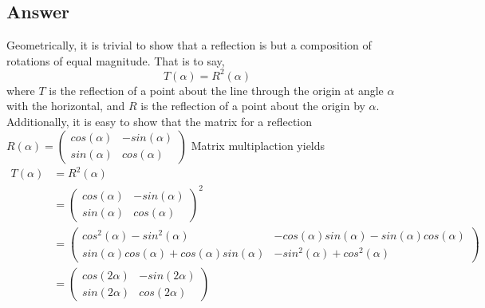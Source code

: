 \documentclass[
	12pt, %
]{fphw}
\begin{document}
\subsection*{Answer}
Geometrically, it is trivial to show that a reflection is but a composition of rotations of equal magnitude. That is to say, $$ T(\alpha)=R^2(\alpha)$$ where $T$ is the reflection of a point about the line through the origin at angle $\alpha$ with the horizontal, and $R$ is the reflection of a point about the origin by $\alpha$. Additionally, it is easy to show that the matrix for a reflection $R(\alpha)=\begin{pmatrix} cos(\alpha) & -sin(\alpha)\\ sin(\alpha) & cos(\alpha) \end{pmatrix}$ 
Matrix multiplaction yields 
\begin{align}
	T(\alpha)&=R^2(\alpha) \\
	&=\begin{pmatrix} cos(\alpha) & -sin(\alpha)\\ sin(\alpha) & cos(\alpha) \end{pmatrix}^2 \\
		&=\begin{pmatrix} cos^2(\alpha)-sin^2(\alpha) & -cos(\alpha)sin(\alpha)-sin(\alpha)cos(\alpha)\\ sin(\alpha)cos(\alpha)+cos(\alpha)sin(\alpha) & -sin^2(\alpha)+cos^2(\alpha) \end{pmatrix} \\
		&=\begin{pmatrix} cos(2\alpha) & -sin(2\alpha)\\ sin(2\alpha) & cos(2\alpha) \end{pmatrix}
\end{align}
\end{document}
